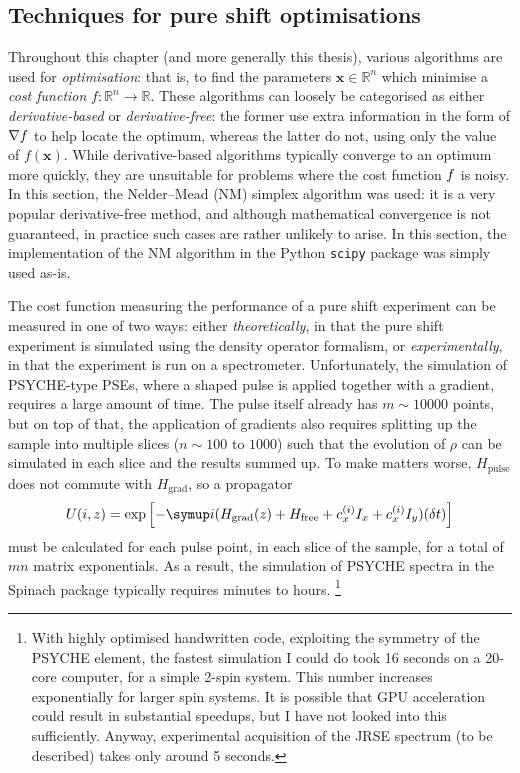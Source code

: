 \subsection{Techniques for pure shift optimisations}
\label{subsec:pureshift__optim_techniques}

Throughout this chapter (and more generally this thesis), various algorithms are used for \textit{optimisation}: that is, to find the parameters $\symbf{x} \in \mathbb{R}^n$ which minimise a \textit{cost function} $f : \mathbb{R}^n \to \mathbb{R}$.
These algorithms can loosely be categorised as either \textit{derivative-based} or \textit{derivative-free}: the former use extra information in the form of $\nabla f\/$ to help locate the optimum, whereas the latter do not, using only the value of $f(\symbf{x})$.
While derivative-based algorithms typically converge to an optimum more quickly, they are unsuitable for problems where the cost function $f\/$ is noisy.
In this section, the Nelder--Mead (NM) simplex algorithm\autocite{Nelder1965TCJ} was used: it is a very popular derivative-free method, and although mathematical convergence is not guaranteed\autocite{McKinnon1998SIAMJO}, in practice such cases are rather unlikely to arise.
In this section, the implementation of the NM algorithm in the Python \texttt{scipy} package was simply used as-is.

The cost function measuring the performance of a pure shift experiment can be measured in one of two ways: either \textit{theoretically}, in that the pure shift experiment is simulated using the density operator formalism, or \textit{experimentally}, in that the experiment is run on a spectrometer.
Unfortunately, the simulation of PSYCHE-type PSEs, where a shaped pulse is applied together with a gradient, requires a large amount of time.
The pulse itself already has $m \sim 10000$ points, but on top of that, the application of gradients also requires splitting up the sample into multiple slices ($n \sim 100$ to $1000$) such that the evolution of $\rho$ can be simulated in each slice and the results summed up.
To make matters worse, $H_\text{pulse}$ does not commute with $H_\text{grad}$, so a propagator
\begin{equation}
    \label{eq:pulse_gradient_propagator}
    U(i, z) = \exp\left[-\mi(H_\text{grad}(z) + H_\text{free} + c_x^{(i)}I_x + c_x^{(i)} I_y)(\delta t)\right]
\end{equation}
must be calculated for each pulse point, in each slice of the sample, for a total of $mn$ matrix exponentials.
As a result, the simulation of PSYCHE spectra in the Spinach package\autocite{Hogben2011JMR} typically requires minutes to hours.%
\footnote{With highly optimised handwritten code, exploiting the symmetry of the PSYCHE element, the fastest simulation I could do took 16 seconds on a 20-core computer, for a simple 2-spin system. This number increases exponentially for larger spin systems. It is possible that GPU acceleration could result in substantial speedups, but I have not looked into this sufficiently. Anyway, experimental acquisition of the JRSE spectrum (to be described) takes only around 5 seconds.}

